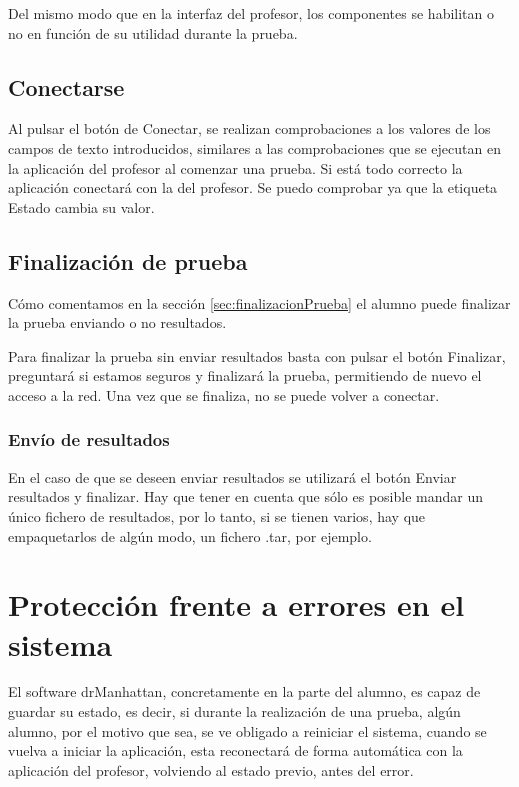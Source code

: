 \documentclass[a4paper,11pt]{article}
\begin{document}
Del mismo modo que en la interfaz del profesor, los componentes se habilitan o no en función de su utilidad durante la prueba.

\subsection{Conectarse}
\label{sec:conectarse}

Al pulsar el botón de Conectar, se realizan comprobaciones a los valores de los campos de texto introducidos, similares a las comprobaciones que se ejecutan en la aplicación del profesor al comenzar una prueba. Si está todo correcto la aplicación conectará con la del profesor. Se puedo comprobar ya que la etiqueta Estado cambia su valor.

\subsection{Finalización de prueba}
\label{sec:finAlumno}

Cómo comentamos en la sección \ref{sec:finalizacionPrueba} el alumno puede finalizar la prueba enviando o no resultados.

Para finalizar la prueba sin enviar resultados basta con pulsar el botón Finalizar, preguntará si estamos seguros y finalizará la prueba, permitiendo de nuevo el acceso a la red. Una vez que se finaliza, no se puede volver a conectar.

\subsubsection{Envío de resultados}
\label{sec:finResultados}

En el caso de que se deseen enviar resultados se utilizará el botón Enviar resultados y finalizar. Hay que tener en cuenta que sólo es posible mandar un único fichero de resultados, por lo tanto, si se tienen varios, hay que empaquetarlos de algún modo, un fichero .tar, por ejemplo.

\newpage
\section{Protección frente a errores en el sistema}

El software drManhattan, concretamente en la parte del alumno, es capaz de guardar su estado, es decir, si durante la realización de una prueba, algún alumno, por el motivo que sea, se ve obligado a reiniciar el sistema, cuando se vuelva a iniciar la aplicación, esta reconectará de forma automática con la aplicación del profesor, volviendo al estado previo, antes del error.
\end{document}
